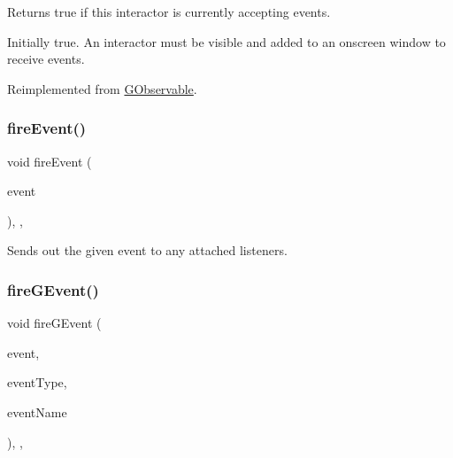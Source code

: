 Returns true if this interactor is currently accepting events. 

Initially true. An interactor must be visible and added to an onscreen window to receive events. 

Reimplemented from \mbox{\hyperlink{classsgl_1_1GObservable_a8ebb3da91032e7f4c34485dabc518b8a}{G\+Observable}}.

\mbox{\label{classsgl_1_1GObservable_a63e5e5a6227c59c928493b11aceb0f67}} 
\subsubsection{\texorpdfstring{fire\+Event()}{fireEvent()}}
{\footnotesize\ttfamily void fire\+Event (\begin{DoxyParamCaption}\item[{\mbox{\hyperlink{classsgl_1_1GEvent}{G\+Event}} \&}]{event }\end{DoxyParamCaption})\hspace{0.3cm}{\ttfamily [protected]}, {\ttfamily [virtual]}, {\ttfamily [inherited]}}



Sends out the given event to any attached listeners. 

\mbox{\label{classsgl_1_1GObservable_ab3983ea07337b52020a29cc00c653d8d}} 
\subsubsection{\texorpdfstring{fire\+G\+Event()}{fireGEvent()}\hspace{0.1cm}{\footnotesize\ttfamily [1/8]}}
{\footnotesize\ttfamily void fire\+G\+Event (\begin{DoxyParamCaption}\item[{Q\+Event $\ast$}]{event,  }\item[{\mbox{\hyperlink{namespacesgl_a2628ea8d12e8b2563c32f05dc7fff6fa}{Event\+Type}}}]{event\+Type,  }\item[{const std\+::string \&}]{event\+Name }\end{DoxyParamCaption})\hspace{0.3cm}{\ttfamily [protected]}, {\ttfamily [virtual]}, {\ttfamily [inherited]}}



